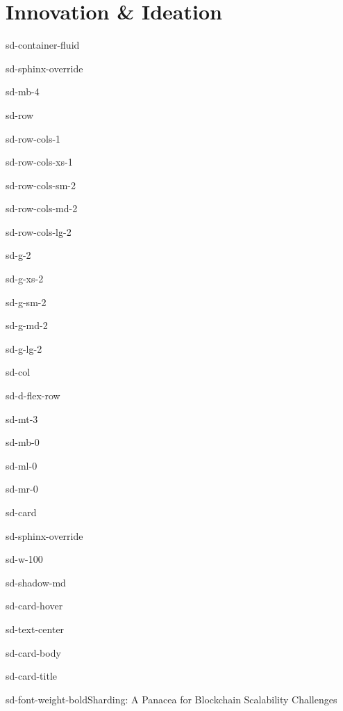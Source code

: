\documentclass[letterpaper,10pt,english]{jupyterBook}
\begin{document}
\chapter{Innovation \& Ideation}
\label{\detokenize{STRUCTURE/innovation:innovation-ideation}}\label{\detokenize{STRUCTURE/innovation::doc}}
\begin{sphinxuseclass}{sd-container-fluid}
\begin{sphinxuseclass}{sd-sphinx-override}
\begin{sphinxuseclass}{sd-mb-4}
\begin{sphinxuseclass}{sd-row}
\begin{sphinxuseclass}{sd-row-cols-1}
\begin{sphinxuseclass}{sd-row-cols-xs-1}
\begin{sphinxuseclass}{sd-row-cols-sm-2}
\begin{sphinxuseclass}{sd-row-cols-md-2}
\begin{sphinxuseclass}{sd-row-cols-lg-2}
\begin{sphinxuseclass}{sd-g-2}
\begin{sphinxuseclass}{sd-g-xs-2}
\begin{sphinxuseclass}{sd-g-sm-2}
\begin{sphinxuseclass}{sd-g-md-2}
\begin{sphinxuseclass}{sd-g-lg-2}
\begin{sphinxuseclass}{sd-col}
\begin{sphinxuseclass}{sd-d-flex-row}
\begin{sphinxuseclass}{sd-mt-3}
\begin{sphinxuseclass}{sd-mb-0}
\begin{sphinxuseclass}{sd-ml-0}
\begin{sphinxuseclass}{sd-mr-0}
\begin{sphinxuseclass}{sd-card}
\begin{sphinxuseclass}{sd-sphinx-override}
\begin{sphinxuseclass}{sd-w-100}
\begin{sphinxuseclass}{sd-shadow-md}
\begin{sphinxuseclass}{sd-card-hover}
\begin{sphinxuseclass}{sd-text-center}
\begin{sphinxuseclass}{sd-card-body}
\begin{sphinxuseclass}{sd-card-title}
\begin{sphinxuseclass}{sd-font-weight-bold}Sharding: A Panacea for Blockchain Scalability Challenges
\end{sphinxuseclass}
\end{sphinxuseclass}





\end{sphinxuseclass}
\end{sphinxuseclass}
\end{sphinxuseclass}
\end{sphinxuseclass}
\end{sphinxuseclass}
\end{sphinxuseclass}
\end{sphinxuseclass}
\end{sphinxuseclass}
\end{sphinxuseclass}
\end{sphinxuseclass}
\end{sphinxuseclass}
\end{sphinxuseclass}
\end{sphinxuseclass}
\end{sphinxuseclass}
\end{sphinxuseclass}
\end{sphinxuseclass}
\end{sphinxuseclass}
\end{sphinxuseclass}
\end{sphinxuseclass}
\end{sphinxuseclass}
\end{sphinxuseclass}
\end{sphinxuseclass}
\end{sphinxuseclass}
\end{sphinxuseclass}
\end{sphinxuseclass}
\end{sphinxuseclass}
\end{sphinxuseclass}
\end{document}

